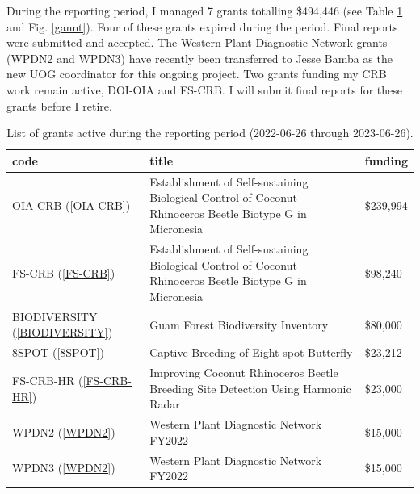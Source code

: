During the reporting period, I managed 7 grants totalling \$494,446 (see Table \ref{grantlist} and Fig. \ref{gannt}). Four of these grants expired during the period. Final reports were submitted and accepted. The Western Plant Diagnostic Network grants (WPDN2 and WPDN3) have recently been transferred to Jesse Bamba as the new UOG coordinator for this ongoing project. Two grants funding my CRB work remain active, DOI-OIA and FS-CRB. I will submit final reports for these grants before I retire.

\begin{table}[h!]
	\centering
	\caption{List of grants active during the reporting period (2022-06-26 through 2023-06-26).}
	\label{grantlist}
	\begin{tabular}{lp{3in}>{\raggedleft\arraybackslash}l}
		\toprule
		code &                                                                                                    title &  funding \\
		\midrule
		OIA-CRB (\ref{OIA-CRB}) & Establishment of Self-sustaining Biological Control of Coconut Rhinoceros Beetle Biotype G in Micronesia & \$239,994 \\
		\midrule
		FS-CRB (\ref{FS-CRB})& Establishment of Self-sustaining Biological Control of Coconut Rhinoceros Beetle Biotype G in Micronesia &  \$98,240 \\
		\midrule
		BIODIVERSITY (\ref{BIODIVERSITY}) &                                                                       Guam Forest Biodiversity Inventory &  \$80,000 \\
		\midrule		
		8SPOT (\ref{8SPOT}) &                                                                 Captive Breeding of Eight-spot Butterfly &  \$23,212 \\
		\midrule
		FS-CRB-HR (\ref{FS-CRB-HR})&                         Improving Coconut Rhinoceros Beetle Breeding Site Detection Using Harmonic Radar &  \$23,000 \\
		\midrule
		WPDN2 (\ref{WPDN2}) &                                                                  Western Plant Diagnostic Network FY2022 &  \$15,000 \\
		\midrule
		WPDN3 (\ref{WPDN2}) &                                                                  Western Plant Diagnostic Network FY2022 &  \$15,000 \\
		\bottomrule
	\end{tabular}
\end{table}

